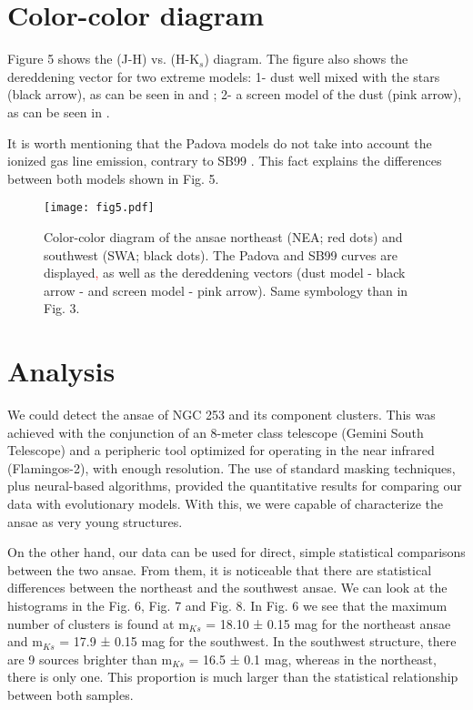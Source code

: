 \documentclass[baaa]{baaa}
\begin{document}
\section{Color-color diagram}

Figure 5 shows the (J-H) vs. (H-K$_{s}$) diagram. The figure also shows the dereddening vector for two extreme models: 1- dust well mixed with the stars (black arrow), as can be seen in \citet{1992ApJ...393..611W} and \citet{1998A&A...336..433I}; 2- a screen model of the dust (pink arrow), as can be seen in \citet{2005ApJ...619..931I}.

It is worth mentioning that the Padova models do not take into account the ionized gas line emission, contrary to SB99 \citep{1999ApJS..123....3L}. This fact explains the differences between both models shown in Fig. 5.

\begin{figure}[!t]
\centering
\texttt{[image: fig5.pdf]}
\caption{Color-color diagram of the ansae northeast (NEA; red dots) and southwest (SWA; black dots). The Padova and SB99 curves are displayed\textcolor{red}{,} as well as the dereddening vectors (dust model - black arrow - and screen model - pink arrow). Same symbology than in Fig. 3.}
\label{Figura}
\end{figure}

\section{Analysis}

We could detect the ansae of NGC 253 and its component clusters. This was achieved with the conjunction of an 8-meter class telescope (Gemini South Telescope) and a peripheric tool optimized for operating in the near infrared (Flamingos-2), with enough resolution. The use of standard masking techniques, plus neural-based algorithms, provided the quantitative results for comparing our data with evolutionary models. With this, we were capable of characterize the ansae as very young structures. 

On the other hand, our data can be used for direct, simple statistical comparisons between the two ansae. From them, it is noticeable that there are statistical differences between the northeast and the southwest ansae. We can look at the histograms in the Fig. 6, Fig. 7 and Fig. 8. In Fig. 6 we see that the maximum number of clusters is found at m$_{Ks}$ = 18.10 ± 0.15 mag for the northeast ansae and m$_{Ks}$ = 17.9 ± 0.15 mag for the southwest. In the southwest structure, there are 9 sources brighter than m$_{Ks}$ = 16.5 ± 0.1 mag, whereas in the northeast, there is only one. This proportion is much larger than the statistical relationship between both samples.
\end{document}
